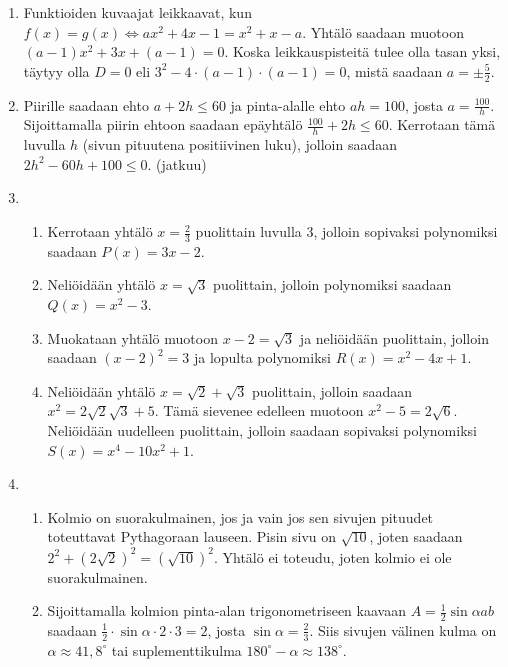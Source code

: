 \documentclass[12pt,fleqn]{article}
\begin{document}
\begin{enumerate}[label=\textbf{\arabic*.}]
\item Funktioiden kuvaajat leikkaavat, kun \(f(x)=g(x)\Leftrightarrow ax^2+4x-1=x^2+x-a\). Yhtälö saadaan muotoon \((a-1)x^2+3x+(a-1)=0\). Koska leikkauspisteitä tulee olla tasan yksi, täytyy olla \(D=0\) eli \(3^2-4\cdot (a-1)\cdot(a-1)=0\), mistä saadaan \(\displaystyle a=\pm \frac{5}{2}\).

\item Piirille saadaan ehto \(a+2h\leq 60\) ja pinta-alalle ehto \(ah=100\), josta \(\displaystyle a=\frac{100}{h}\). Sijoittamalla piirin ehtoon saadaan epäyhtälö \(\frac{100}{h}+2h\leq 60\). Kerrotaan tämä luvulla \(h\) (sivun pituutena positiivinen luku), jolloin saadaan \(2h^2 - 60h + 100 \leq 0\). (jatkuu)

\item
\begin{enumerate}[label=\textbf{\alph*)}]
\item Kerrotaan yhtälö \(x=\frac{2}{3}\) puolittain luvulla 3, jolloin sopivaksi polynomiksi saadaan \(P(x)=3x-2\).

\item Neliöidään yhtälö \(x=\sqrt{3}\) puolittain, jolloin polynomiksi saadaan \(Q(x)=x^2-3\).

\item Muokataan yhtälö muotoon \(x-2=\sqrt{3}\) ja neliöidään puolittain, jolloin saadaan \((x-2)^2=3\) ja lopulta polynomiksi \(R(x)=x^2-4x+1\).

\item Neliöidään yhtälö \(x=\sqrt{2}+\sqrt{3}\) puolittain, jolloin saadaan \(x^2=2\sqrt{2}\sqrt{3} + 5\). Tämä sievenee edelleen muotoon \(x^2-5=2\sqrt{6}\). Neliöidään uudelleen puolittain, jolloin saadaan sopivaksi polynomiksi \(S(x)=x^4-10x^2+1\).
\end{enumerate}

\item 
\begin{enumerate}[label=\textbf{\alph*)}]
\item Kolmio on suorakulmainen, jos ja vain jos sen sivujen pituudet toteuttavat Pythagoraan lauseen. Pisin sivu on \(\sqrt{10}\), joten saadaan \(2^2+(2\sqrt{2})^2=(\sqrt{10})^2\). Yhtälö ei toteudu, joten kolmio ei ole suorakulmainen.

\item Sijoittamalla kolmion pinta-alan trigonometriseen kaavaan \(A=\frac{1}{2}\sin{\alpha}ab\) saadaan \(\frac{1}{2}\cdot \sin{\alpha}\cdot 2\cdot 3=2\), josta \(\sin{\alpha}=\frac{2}{3}\). Siis sivujen välinen kulma on \(\alpha \approx 41,8^{\circ}\) tai suplementtikulma \(180^{\circ}-\alpha \approx 138^{\circ}\).
\end{enumerate}


\end{enumerate}
\end{document}
